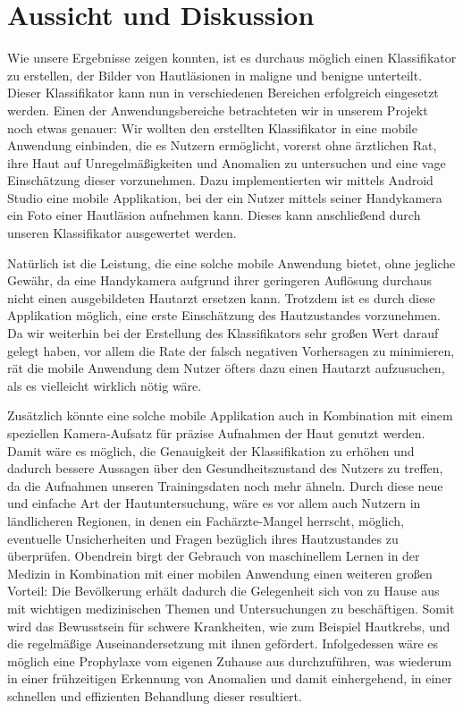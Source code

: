 \section{Aussicht und Diskussion}

Wie unsere Ergebnisse zeigen konnten, ist es durchaus möglich einen Klassifikator zu erstellen, der Bilder von Hautläsionen in maligne und benigne unterteilt. Dieser Klassifikator kann nun in verschiedenen Bereichen erfolgreich eingesetzt werden. Einen der Anwendungsbereiche betrachteten wir in unserem Projekt noch etwas genauer: Wir wollten den erstellten Klassifikator in eine mobile Anwendung einbinden, die es Nutzern ermöglicht, vorerst ohne ärztlichen Rat, ihre Haut auf Unregelmäßigkeiten und Anomalien zu untersuchen und eine vage Einschätzung dieser vorzunehmen. Dazu implementierten wir mittels Android Studio eine mobile Applikation, bei der ein Nutzer mittels seiner Handykamera ein Foto einer Hautläsion aufnehmen kann. Dieses kann anschließend durch unseren Klassifikator ausgewertet werden. 

Natürlich ist die Leistung, die eine solche mobile Anwendung bietet, ohne jegliche Gewähr, da eine Handykamera aufgrund ihrer geringeren Auflösung durchaus nicht einen ausgebildeten Hautarzt ersetzen kann. Trotzdem ist es durch diese Applikation möglich, eine erste Einschätzung des Hautzustandes vorzunehmen. Da wir weiterhin bei der Erstellung des Klassifikators sehr großen Wert darauf gelegt haben, vor allem die Rate der falsch negativen Vorhersagen zu minimieren, rät die mobile Anwendung dem Nutzer öfters dazu einen Hautarzt aufzusuchen, als es vielleicht wirklich nötig wäre. 

Zusätzlich könnte eine solche mobile Applikation auch in Kombination mit einem speziellen Kamera-Aufsatz für präzise Aufnahmen der Haut genutzt werden. Damit wäre es möglich, die Genauigkeit der Klassifikation zu erhöhen und dadurch bessere Aussagen über den Gesundheitszustand des Nutzers zu treffen, da die Aufnahmen unseren Trainingsdaten noch mehr ähneln. Durch diese neue und einfache Art der Hautuntersuchung, wäre es vor allem auch Nutzern in ländlicheren Regionen, in denen ein Fachärzte-Mangel herrscht, möglich, eventuelle Unsicherheiten und Fragen bezüglich ihres Hautzustandes zu überprüfen. Obendrein birgt der Gebrauch von maschinellem Lernen in der Medizin in Kombination mit einer mobilen Anwendung einen weiteren großen Vorteil: Die Bevölkerung erhält dadurch die Gelegenheit sich von zu Hause aus mit wichtigen medizinischen Themen und Untersuchungen zu beschäftigen. Somit wird das Bewusstsein für schwere Krankheiten, wie zum Beispiel Hautkrebs, und die regelmäßige Auseinandersetzung mit ihnen gefördert. Infolgedessen wäre es möglich eine Prophylaxe vom eigenen Zuhause aus durchzuführen, was wiederum in einer frühzeitigen Erkennung von Anomalien und damit einhergehend, in einer schnellen und effizienten Behandlung dieser resultiert.

